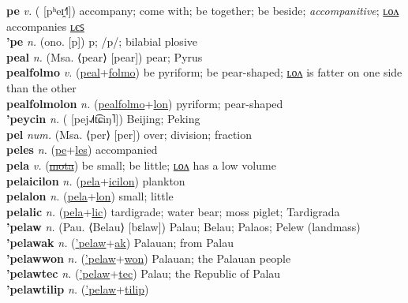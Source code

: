 \textbf{pe} \textit{v.} ( [pʰeɪ̯˧˥])
accompany; come with; be together; be beside; \textit{accompanitive}; \hyperref[pelon]{ʟᴏᴧ} accompanies \hyperref[peles]{ʟєꜱ} \label{pe} \\
\textbf{'pe} \textit{n.} (ono. [p])
p; /p/; bilabial plosive \label{'pe} \\
\textbf{peal} \textit{n.} (Msa. ⟨pear⟩ [pear])
pear; Pyrus \label{peal} \\
\textbf{pealfolmo} \textit{v.} (\hyperref[peal]{peal}+\hyperref[folmo]{folmo})
be pyriform; be pear-shaped; \hyperref[pealfolmolon]{ʟᴏᴧ} is fatter on one side than the other \label{pealfolmo} \\
\textbf{pealfolmolon} \textit{n.} (\hyperref[pealfolmo]{pealfolmo}+\hyperref[lon]{lon})
pyriform; pear-shaped \label{pealfolmolon} \\
\textbf{'peycin} \textit{n.} ( [pej˨˩˦t͡ɕiŋ˥])
Beijing; Peking \label{'peycin} \\
\textbf{pel} \textit{num.} (Msa. ⟨per⟩ [per])
over; division; fraction \label{pel} \\
\textbf{peles} \textit{n.} (\hyperref[pe]{pe}+\hyperref[les]{les})
accompanied \label{peles} \\
\textbf{pela} \textit{v.} (\hyperref[mota]{\sout{mota}})
be small; be little; \hyperref[pelalon]{ʟᴏᴧ} has a low volume \label{pela} \\
\textbf{pelaicilon} \textit{n.} (\hyperref[pela]{pela}+\hyperref[icilon]{icilon})
plankton \label{pelaicilon} \\
\textbf{pelalon} \textit{n.} (\hyperref[pela]{pela}+\hyperref[lon]{lon})
small; little \label{pelalon} \\
\textbf{pelalic} \textit{n.} (\hyperref[pela]{pela}+\hyperref[lic]{lic})
tardigrade; water bear; moss piglet; Tardigrada \label{pelalic} \\
\textbf{'pelaw} \textit{n.} (Pau. ⟨Belau⟩ [bɛlaw])
Palau; Belau; Palaos; Pelew (landmass) \label{'pelaw} \\
\textbf{'pelawak} \textit{n.} (\hyperref['pelaw]{'pelaw}+\hyperref[ak]{ak})
Palauan; from Palau \label{'pelawak} \\
\textbf{'pelawwon} \textit{n.} (\hyperref['pelaw]{'pelaw}+\hyperref[won]{won})
Palauan; the Palauan people \label{'pelawwon} \\
\textbf{'pelawtec} \textit{n.} (\hyperref['pelaw]{'pelaw}+\hyperref[tec]{tec})
Palau; the Republic of Palau \label{'pelawtec} \\
\textbf{'pelawtilip} \textit{n.} (\hyperref['pelaw]{'pelaw}+\hyperref[tilip]{tilip})
